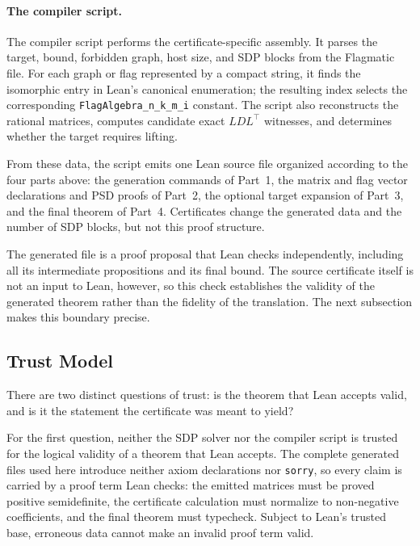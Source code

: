 \documentclass{article}
\newcommand{\lean}[1]{\texttt{#1}}
\begin{document}
\paragraph{The compiler script.}
The compiler script performs the certificate-specific assembly.  It parses
the target, bound, forbidden graph, host size, and SDP blocks from the
Flagmatic file.  For each graph or flag represented by a compact string, it
finds the isomorphic entry in Lean's canonical enumeration; the resulting
index selects the corresponding \lean{FlagAlgebra\_n\_k\_m\_i} constant.  The
script also reconstructs the rational matrices, computes candidate exact
$LDL^\top$ witnesses, and determines whether the target requires lifting.

From these data, the script emits one Lean source file organized according to
the four parts above: the generation commands of Part~1, the matrix and flag
vector declarations and PSD proofs of Part~2, the optional target expansion
of Part~3, and the final theorem of Part~4.  Certificates change the generated
data and the number of SDP blocks, but not this proof structure.

The generated file is a proof proposal that Lean checks independently,
including all its intermediate propositions and its final bound.  The source
certificate itself is not an input to Lean, however, so this check establishes
the validity of the generated theorem rather than the fidelity of the
translation.  The next subsection makes this boundary precise.

\subsection{Trust Model}
\label{sec:flagmatic-trust}

There are two distinct questions of trust: is the theorem that Lean accepts
valid, and is it the statement the certificate was meant to yield?

For the first question, neither the SDP solver nor the compiler script is
trusted for the logical validity of a theorem that Lean accepts.  The
complete generated files used here introduce neither axiom declarations nor
\lean{sorry}, so every claim is carried by a proof term Lean checks: the
emitted matrices must be proved positive semidefinite, the certificate
calculation must normalize to non-negative coefficients, and the final
theorem must typecheck.  Subject to Lean's trusted base, erroneous data
cannot make an invalid proof term valid.
\end{document}
